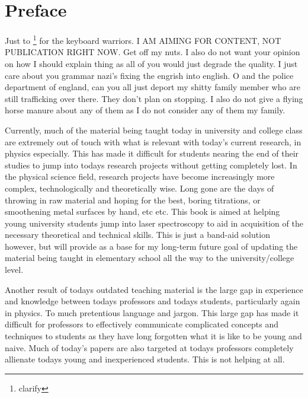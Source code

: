 \documentclass[11pt,a4paper]{book}
\begin{document}
\frontmatter
	
\chapter{Preface}
	\label{chp:preface}
	Just to \footnote{clarify} for the keyboard warriors. I AM AIMING FOR CONTENT, NOT PUBLICATION RIGHT NOW. Get off my nuts. I also do not want your opinion on how I should explain thing as all of you would just degrade the quality. I just care about you grammar nazi's fixing the engrish into english. O and the police department of england, can you all just deport my shitty family member who are still trafficking over there. They don't plan on stopping. I also do not give a flying horse manure about any of them as I do not consider any of them my family.
	
	Currently, much of the material being taught today in university and college class are extremely out of touch with what is relevant with today's current research, in physics especially. This has made it difficult for students nearing the end of their studies to jump into todays research projects without getting completely lost. In the physical science field, research projects have become increasingly more complex, technologically and theoretically wise. Long gone are the days of throwing in raw material and hoping for the best, boring titrations, or smoothening metal surfaces by hand, etc etc. This book is aimed at helping young university students jump into laser spectroscopy to aid in acquisition of the necessary theoretical and technical skills. This is just a band-aid solution however, but will provide as a base for my long-term future goal of updating the material being taught in elementary school all the way to the university/college level. 
	
	Another result of todays outdated teaching material is the large gap in experience and knowledge between todays professors and todays students, particularly again in physics. To much pretentious language and jargon. This large gap has made it difficult for professors to effectively communicate complicated concepts and techniques to students as they have long forgotten what it is like to be young and naive. Much of today's papers are also targeted at todays professors completely allienate todays young and inexperienced students. This is not helping at all.
	
\end{document}
